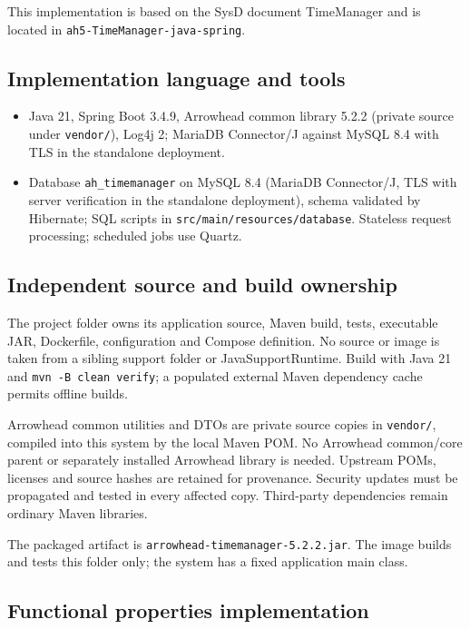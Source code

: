 \documentclass[a4paper]{arrowhead}
\begin{document}
This implementation is based on the SysD document TimeManager \cite{tim-sysd} and is located in \texttt{ah5-TimeManager-java-spring}.

\subsection{Implementation language and tools}
\begin{itemize}
\item Java 21, Spring Boot 3.4.9, Arrowhead common library 5.2.2 (private source under \texttt{vendor/}), Log4j 2; MariaDB Connector/J against MySQL 8.4 with TLS in the standalone deployment.
\item Database \texttt{ah\_\allowbreak{}timemanager} on MySQL 8.4 (MariaDB Connector/J, TLS with server verification in the standalone deployment), schema validated by Hibernate; SQL scripts in \texttt{src/\allowbreak{}main/\allowbreak{}resources/\allowbreak{}database}. Stateless request processing; scheduled jobs use Quartz.
\end{itemize}

\subsection{Independent source and build ownership}
The project folder owns its application source, Maven build, tests, executable JAR, Dockerfile, configuration and Compose definition. No source or image is taken from a sibling support folder or JavaSupportRuntime. Build with Java 21 and \texttt{mvn -B clean verify}; a populated external Maven dependency cache permits offline builds.

Arrowhead common utilities and DTOs are private source copies in \texttt{vendor/}, compiled into this system by the local Maven POM. No Arrowhead common/core parent or separately installed Arrowhead library is needed. Upstream POMs, licenses and source hashes are retained for provenance. Security updates must be propagated and tested in every affected copy. Third-party dependencies remain ordinary Maven libraries.

The packaged artifact is \texttt{arrowhead-\allowbreak{}timemanager-5.2.2.jar}. The image builds and tests this folder only; the system has a fixed application main class.

\subsection{Functional properties implementation}
\end{document}

